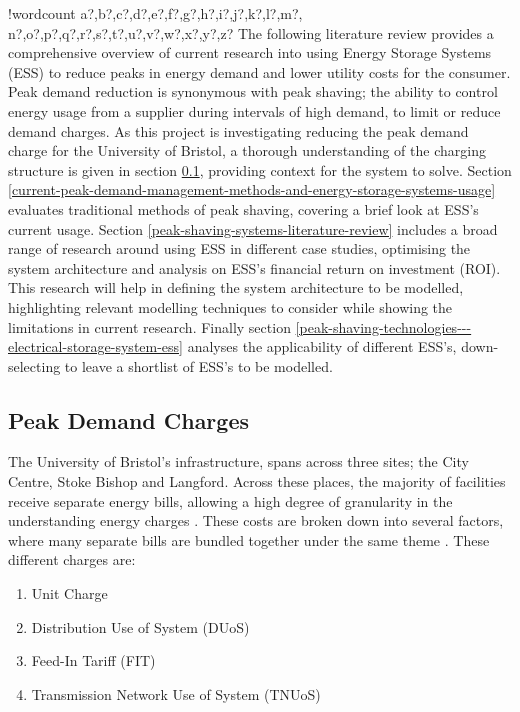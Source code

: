 \documentclass[10pt]{article}
\newcounter{words}
\newenvironment{counted}{%
  \setcounter{words}{0}
  \SearchList!{wordcount}{\stepcounter{words}}
    {a?,b?,c?,d?,e?,f?,g?,h?,i?,j?,k?,l?,m?,
    n?,o?,p?,q?,r?,s?,t?,u?,v?,w?,x?,y?,z?}
  \UndoBoundary{'}
  \SearchOrder{p;}}{%
  \StopSearching}
\begin{document}
\begin{counted}
The following literature review provides a comprehensive overview of
current research into using Energy Storage Systems (ESS) to reduce peaks
in energy demand and lower utility costs for the consumer. Peak demand
reduction is synonymous with peak shaving; the ability to control energy
usage from a supplier during intervals of high demand, to limit or
reduce demand charges\cite{schneiderRECPS}. As this project is
investigating reducing the peak demand charge for the University of
Bristol, a thorough understanding of the charging structure is given in
section \ref{peak-demand-charges}, providing context for the system to
solve. Section
\ref{current-peak-demand-management-methods-and-energy-storage-systems-usage}
evaluates traditional methods of peak shaving, covering a brief look at
ESS's current usage. Section
\ref{peak-shaving-systems-literature-review} includes a broad range of
research around using ESS in different case studies, optimising the
system architecture and analysis on ESS's financial return on investment
(ROI). This research will help in defining the system architecture to be
modelled, highlighting relevant modelling techniques to consider while
showing the limitations in current research. Finally section
\ref{peak-shaving-technologies---electrical-storage-system-ess} analyses
the applicability of different ESS's, down-selecting to leave a
shortlist of ESS's to be modelled.

\subsection{Peak Demand Charges}\label{peak-demand-charges}

The University of Bristol's infrastructure, spans across three sites;
the City Centre, Stoke Bishop and Langford. Across these places, the
majority of facilities receive separate energy bills, allowing a high
degree of granularity in the understanding energy charges
\cite{Jbrentmeet}. These costs are broken down into several factors,
where many separate bills are bundled together under the same theme
\cite{Jbrentmeet}. These different charges are:

\begin{multicols}{2}
\begin{enumerate}
\item Unit Charge
\item Distribution Use of System (DUoS)
\item Feed-In Tariff (FIT)
\item Transmission Network Use of System (TNUoS)
\end{enumerate}
\end{multicols}


\end{counted}
\end{document}
